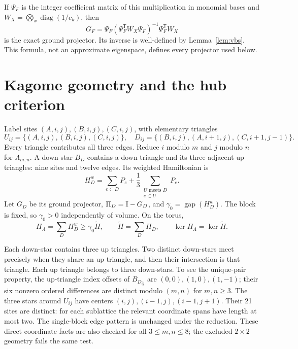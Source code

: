 \documentclass[11pt,a4paper]{article}
\theoremstyle{remark}\newtheorem{remark}[theorem]{Remark}
\newcommand{\gap}{\operatorname{gap}}\newcommand{\ran}{\operatorname{ran}}
\newcommand{\Hb}{\widetilde H}\newcommand{\Dstar}{\Delta_*}
\begin{document}
If $\Psi_F$ is the integer coefficient matrix of this multiplication in monomial bases and $W_X=\bigotimes_x\operatorname{diag}(1/c_k)$, then
\begin{equation}\label{eq:gramproj}
 G_F=\Psi_F(\Psi_F^{\mathsf T}W_X\Psi_F)^{-1}\Psi_F^{\mathsf T}W_X
\end{equation}
is the exact ground projector. Its inverse is well-defined by Lemma~\ref{lem:vbs}. This formula, not an approximate eigenspace, defines every projector used below.

\section{Kagome geometry and the hub criterion}\label{sec:geometry}
Label sites $(A,i,j),(B,i,j),(C,i,j)$, with elementary triangles
\[
 U_{ij}=\{(A,i,j),(B,i,j),(C,i,j)\},\quad
 D_{ij}=\{(B,i,j),(A,i+1,j),(C,i+1,j-1)\}.
\]
Every triangle contributes all three edges. Reduce $i$ modulo $m$ and $j$ modulo $n$ for $\Lambda_{m,n}$. A down-star $B_D$ contains a down triangle and its three adjacent up triangles: nine sites and twelve edges. Its weighted Hamiltonian is
\begin{equation}\label{eq:weighted}
 H_D^w=\sum_{e\subset D}P_e+
 \frac13\sum_{\substack{U\text{ meets }D\\e\subset U}}P_e.
\end{equation}
Let $G_D$ be its ground projector, $\Pi_D=\mathbb I-G_D$, and $\gamma_0=\gap(H_D^w)$. The block is fixed, so $\gamma_0>0$ independently of volume. On the torus,
\begin{equation}\label{eq:domination}
 H_\Lambda=\sum_D H_D^w\ge\gamma_0\Hb,
 \qquad\Hb=\sum_D\Pi_D,\qquad\ker H_\Lambda=\ker\Hb.
\end{equation}

Each down-star contains three up triangles. Two distinct down-stars meet precisely when they share an up triangle, and then their intersection is that triangle. Each up triangle belongs to three down-stars. To see the unique-pair property, the up-triangle index offsets of $B_{D_{ij}}$ are $(0,0),(1,0),(1,-1)$; their six nonzero ordered differences are distinct modulo $(m,n)$ for $m,n\ge3$. The three stars around $U_{ij}$ have centers $(i,j),(i-1,j),(i-1,j+1)$. Their 21 sites are distinct: for each sublattice the relevant coordinate spans have length at most two. The single-block edge pattern is unchanged under the reduction. These direct coordinate facts are also checked for all $3\le m,n\le8$; the excluded $2\times2$ geometry fails the same test.
\end{document}
